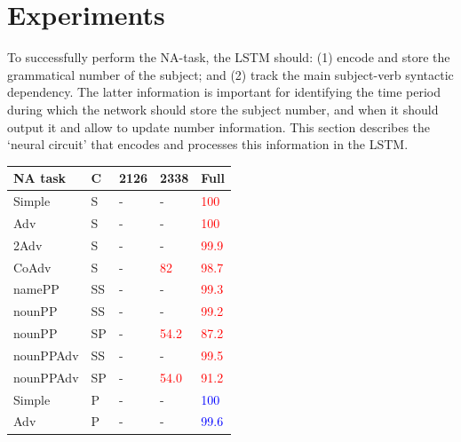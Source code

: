 \section{Experiments}\label{sec:results}
To successfully perform the NA-task, the LSTM should: (1) encode and store the grammatical number of the subject; and (2) track the main subject-verb syntactic dependency. The latter information is important for identifying the time period during which the network should store the subject number, and when it should output it and allow to update number information. This section describes the `neural circuit' that encodes and processes this information in the LSTM.

\begin{center}
\begin{table}[ht]
\centering
\begin{tabular}{|P{2.3cm}|P{0.4cm}||P{0.6cm}|P{0.6cm}|P{0.6cm}|}
\hline
\B NA task & \B C & \B \textbf{\unit{2}{126}} & \B \textbf{\unit{2}{338}} & \B Full \\
\hline

Simple & S & - &  - &  \textcolor{red}{100} \\

Adv & S & - &  - &  \textcolor{red}{100} \\

2Adv & S & - &  - &  \textcolor{red}{99.9} \\

CoAdv & S & - &  \textcolor{red}{82} &  \textcolor{red}{98.7} \\

namePP & SS & - &  - &  \textcolor{red}{99.3} \\

nounPP & SS & - &  - &  \textcolor{red}{99.2} \\

nounPP & SP &  - &  \textcolor{red}{54.2} &  \textcolor{red}{87.2} \\

nounPPAdv & SS &  - &  - & \textcolor{red}{99.5} \\

nounPPAdv & SP &  - &  \textcolor{red}{54.0} & \textcolor{red}{91.2} \\


\hline
Simple & P &  - &  - &  \textcolor{blue}{100} \\

Adv & P &  - &  - &  \textcolor{blue}{99.6} \\


\end{tabular}
\end{table}
\end{center}
